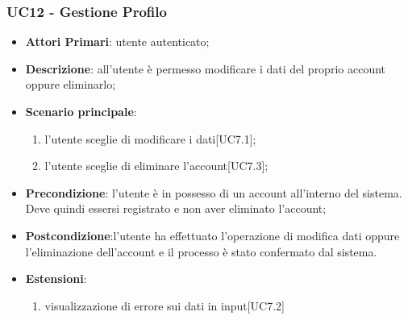 \subsubsection{UC12 - Gestione Profilo}
\begin{itemize}
	\item \textbf{Attori Primari}: utente autenticato;
	\item \textbf{Descrizione}: all'utente è permesso modificare i dati del proprio account oppure eliminarlo;
	\item \textbf{Scenario principale}: 
	\begin{enumerate}[label=\alph*.]
		\item l'utente sceglie di modificare i dati[UC7.1];
		\item l'utente sceglie di eliminare l'account[UC7.3];
	\end{enumerate}
	
	\item \textbf{Precondizione}: l'utente è in possesso di un account all'interno del sistema. Deve quindi essersi registrato e non aver eliminato l'account;
	\item \textbf{Postcondizione}:l'utente ha effettuato l'operazione di modifica dati oppure l'eliminazione dell'account e il processo è stato confermato dal sistema.
	\item \textbf{Estensioni}:
	\begin{enumerate}
	\item visualizzazione di errore sui dati in input[UC7.2]
	\end{enumerate}
\end{itemize} 
